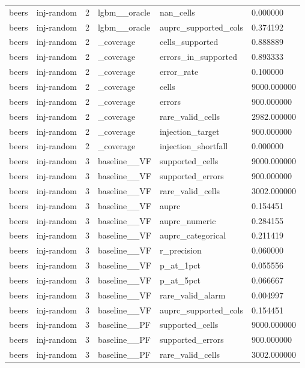 \begin{tabular}{llllll}
beers & inj-random & 2 & lgbm\_\_oracle & nan\_cells & 0.000000 \\
beers & inj-random & 2 & lgbm\_\_oracle & auprc\_supported\_cols & 0.374192 \\
beers & inj-random & 2 & \_coverage & cells\_supported & 0.888889 \\
beers & inj-random & 2 & \_coverage & errors\_in\_supported & 0.893333 \\
beers & inj-random & 2 & \_coverage & error\_rate & 0.100000 \\
beers & inj-random & 2 & \_coverage & cells & 9000.000000 \\
beers & inj-random & 2 & \_coverage & errors & 900.000000 \\
beers & inj-random & 2 & \_coverage & rare\_valid\_cells & 2982.000000 \\
beers & inj-random & 2 & \_coverage & injection\_target & 900.000000 \\
beers & inj-random & 2 & \_coverage & injection\_shortfall & 0.000000 \\
beers & inj-random & 3 & baseline\_\_VF & supported\_cells & 9000.000000 \\
beers & inj-random & 3 & baseline\_\_VF & supported\_errors & 900.000000 \\
beers & inj-random & 3 & baseline\_\_VF & rare\_valid\_cells & 3002.000000 \\
beers & inj-random & 3 & baseline\_\_VF & auprc & 0.154451 \\
beers & inj-random & 3 & baseline\_\_VF & auprc\_numeric & 0.284155 \\
beers & inj-random & 3 & baseline\_\_VF & auprc\_categorical & 0.211419 \\
beers & inj-random & 3 & baseline\_\_VF & r\_precision & 0.060000 \\
beers & inj-random & 3 & baseline\_\_VF & p\_at\_1pct & 0.055556 \\
beers & inj-random & 3 & baseline\_\_VF & p\_at\_5pct & 0.066667 \\
beers & inj-random & 3 & baseline\_\_VF & rare\_valid\_alarm & 0.004997 \\
beers & inj-random & 3 & baseline\_\_VF & auprc\_supported\_cols & 0.154451 \\
beers & inj-random & 3 & baseline\_\_PF & supported\_cells & 9000.000000 \\
beers & inj-random & 3 & baseline\_\_PF & supported\_errors & 900.000000 \\
beers & inj-random & 3 & baseline\_\_PF & rare\_valid\_cells & 3002.000000 \\

\end{tabular}

